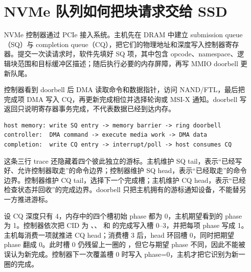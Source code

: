 \section{NVMe 队列如何把块请求交给 SSD}

NVMe 控制器通过 PCIe 接入系统。主机先在 DRAM 中建立 submission queue（SQ）与 completion queue（CQ），把它们的物理地址和深度写入控制器寄存器。提交一次读请求时，软件先填好 SQ 项，其中包含 opcode、namespace、逻辑块范围和目标缓冲区描述；随后执行必要的内存屏障，再写 MMIO doorbell 更新队尾。

控制器看到 doorbell 后 DMA 读取命令和数据指针，访问 NAND/FTL，最后把完成项 DMA 写入 CQ，再更新完成相位并选择轮询或 MSI-X 通知。doorbell 写返回只说明寄存器事务完成，不代表数据已经到达内存。

\begin{lstlisting}
host memory: write SQ entry -> memory barrier -> ring doorbell
controller:  DMA command -> execute media work -> DMA data
completion:  write CQ entry -> interrupt/poll -> host consumes CQ
\end{lstlisting}

这条三行 trace 还隐藏着四个彼此独立的游标。主机维护 SQ tail，表示“已经写好、允许控制器取走”的命令边界；控制器维护 SQ head，表示“已经取走”的命令边界。控制器维护 CQ tail，选择下一个完成槽；主机维护 CQ head，表示“已经检查状态并回收”的完成边界。doorbell 只把主机拥有的游标通知设备，不能替另一方推进游标。


设 CQ 深度只有 4，内存中的四个槽初始 phase 都为 0，主机期望看到的 phase 为 1。控制器依次把 CID 为 、、 和  的完成写入槽 0--3，并把每项 phase 写成 1。主机每消费一项就推进 CQ head；消费槽 3 后，head 环回槽 0，同时把期望 phase 翻成 0。此时槽 0 仍残留上一圈的 ，但它与期望 phase 不同，因此不能被误认为新完成。控制器下一次覆盖槽 0 时写入 phase=0，主机才把它识别为新一圈的完成。\cite{nvme-spec}

